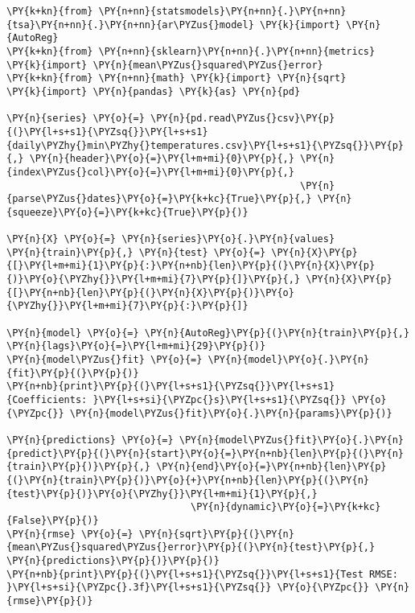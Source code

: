 \begin{codebox}[breakable, size=fbox, boxrule=1pt, pad at break*=1mm,colback=cellbackground, colframe=cellborder]
\begin{Verbatim}[commandchars=\\\{\}]
\PY{k+kn}{from} \PY{n+nn}{statsmodels}\PY{n+nn}{.}\PY{n+nn}{tsa}\PY{n+nn}{.}\PY{n+nn}{ar\PYZus{}model} \PY{k}{import} \PY{n}{AutoReg}
\PY{k+kn}{from} \PY{n+nn}{sklearn}\PY{n+nn}{.}\PY{n+nn}{metrics} \PY{k}{import} \PY{n}{mean\PYZus{}squared\PYZus{}error}
\PY{k+kn}{from} \PY{n+nn}{math} \PY{k}{import} \PY{n}{sqrt}
\PY{k}{import} \PY{n}{pandas} \PY{k}{as} \PY{n}{pd}

\PY{n}{series} \PY{o}{=} \PY{n}{pd.read\PYZus{}csv}\PY{p}{(}\PY{l+s+s1}{\PYZsq{}}\PY{l+s+s1}{daily\PYZhy{}min\PYZhy{}temperatures.csv}\PY{l+s+s1}{\PYZsq{}}\PY{p}{,} \PY{n}{header}\PY{o}{=}\PY{l+m+mi}{0}\PY{p}{,} \PY{n}{index\PYZus{}col}\PY{o}{=}\PY{l+m+mi}{0}\PY{p}{,}
                                                   \PY{n}{parse\PYZus{}dates}\PY{o}{=}\PY{k+kc}{True}\PY{p}{,} \PY{n}{squeeze}\PY{o}{=}\PY{k+kc}{True}\PY{p}{)}

\PY{n}{X} \PY{o}{=} \PY{n}{series}\PY{o}{.}\PY{n}{values}
\PY{n}{train}\PY{p}{,} \PY{n}{test} \PY{o}{=} \PY{n}{X}\PY{p}{[}\PY{l+m+mi}{1}\PY{p}{:}\PY{n+nb}{len}\PY{p}{(}\PY{n}{X}\PY{p}{)}\PY{o}{\PYZhy{}}\PY{l+m+mi}{7}\PY{p}{]}\PY{p}{,} \PY{n}{X}\PY{p}{[}\PY{n+nb}{len}\PY{p}{(}\PY{n}{X}\PY{p}{)}\PY{o}{\PYZhy{}}\PY{l+m+mi}{7}\PY{p}{:}\PY{p}{]}

\PY{n}{model} \PY{o}{=} \PY{n}{AutoReg}\PY{p}{(}\PY{n}{train}\PY{p}{,} \PY{n}{lags}\PY{o}{=}\PY{l+m+mi}{29}\PY{p}{)}
\PY{n}{model\PYZus{}fit} \PY{o}{=} \PY{n}{model}\PY{o}{.}\PY{n}{fit}\PY{p}{(}\PY{p}{)}
\PY{n+nb}{print}\PY{p}{(}\PY{l+s+s1}{\PYZsq{}}\PY{l+s+s1}{Coefficients: }\PY{l+s+si}{\PYZpc{}s}\PY{l+s+s1}{\PYZsq{}} \PY{o}{\PYZpc{}} \PY{n}{model\PYZus{}fit}\PY{o}{.}\PY{n}{params}\PY{p}{)}

\PY{n}{predictions} \PY{o}{=} \PY{n}{model\PYZus{}fit}\PY{o}{.}\PY{n}{predict}\PY{p}{(}\PY{n}{start}\PY{o}{=}\PY{n+nb}{len}\PY{p}{(}\PY{n}{train}\PY{p}{)}\PY{p}{,} \PY{n}{end}\PY{o}{=}\PY{n+nb}{len}\PY{p}{(}\PY{n}{train}\PY{p}{)}\PY{o}{+}\PY{n+nb}{len}\PY{p}{(}\PY{n}{test}\PY{p}{)}\PY{o}{\PYZhy{}}\PY{l+m+mi}{1}\PY{p}{,} 
                                \PY{n}{dynamic}\PY{o}{=}\PY{k+kc}{False}\PY{p}{)}
\PY{n}{rmse} \PY{o}{=} \PY{n}{sqrt}\PY{p}{(}\PY{n}{mean\PYZus{}squared\PYZus{}error}\PY{p}{(}\PY{n}{test}\PY{p}{,} \PY{n}{predictions}\PY{p}{)}\PY{p}{)}
\PY{n+nb}{print}\PY{p}{(}\PY{l+s+s1}{\PYZsq{}}\PY{l+s+s1}{Test RMSE: }\PY{l+s+si}{\PYZpc{}.3f}\PY{l+s+s1}{\PYZsq{}} \PY{o}{\PYZpc{}} \PY{n}{rmse}\PY{p}{)}


\end{Verbatim}
\end{codebox}
